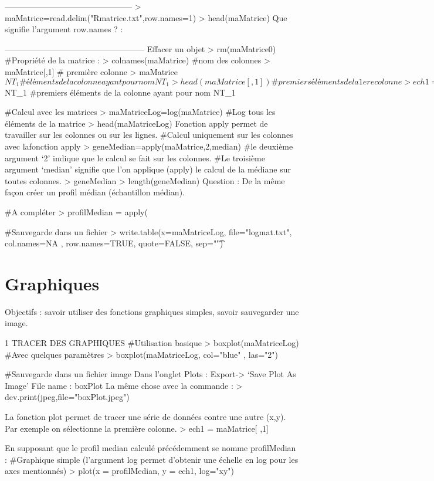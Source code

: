 \documentclass[a4paper]{article}
\begin{document}
-----------------------------------------------
> maMatrice=read.delim("Rmatrice.txt",row.names=1)
> head(maMatrice)
Que signifie l'argument row.names ? :

---------------------------------------------------
Effacer un objet
> rm(maMatrice0)
\#Propriété de la matrice :
> colnames(maMatrice) \#nom des colonnes
> maMatrice[,1] \# première colonne
> maMatrice$NT_1 \# éléments de la colonne ayant pour nom NT_1
> head(maMatrice[,1]) \#premiers éléments de la 1ere colonne
> ech1= maMatrice[,1]
> echNT1=maMatrice$NT_1 \#premiers éléments de la colonne ayant pour nom NT_1

\#Calcul avec les matrices
> maMatriceLog=log(maMatrice) \#Log tous les éléments de la matrice
> head(maMatriceLog)
Fonction apply permet de travailler sur les colonnes ou sur les lignes.
\#Calcul uniquement sur les colonnes avec lafonction apply
> geneMedian=apply(maMatrice,2,median)
\#le deuxième argument ‘2' indique que le calcul se fait sur les colonnes. 
\#Le troisième argument ‘median' signifie que l'on applique (apply) le calcul de la médiane sur toutes colonnes.
> geneMedian
> length(geneMedian)
Question : De la même façon créer un profil médian (échantillon médian).

\#A compléter
> profilMedian = apply(

\#Sauvegarde dans un fichier
> write.table(x=maMatriceLog, file="logmat.txt", col.names=NA ,
row.names=TRUE, quote=FALSE, sep="\t")


\section{Graphiques}
Objectifs : savoir utiliser des fonctions graphiques simples, savoir sauvegarder une image.

1	TRACER DES GRAPHIQUES
\#Utilisation basique
> boxplot(maMatriceLog)
\#Avec quelques paramètres
> boxplot(maMatriceLog, col="blue" , las="2")

\#Sauvegarde dans un fichier image
Dans l'onglet Plots : Export-> ‘Save Plot As Image'
File name :  boxPlot
La même chose avec la commande : 
> dev.print(jpeg,file="boxPlot.jpeg")

La fonction plot permet de tracer une série de données contre une autre (x,y).
Par exemple on sélectionne la première colonne.
> ech1 = maMatrice[ ,1]

En supposant que le profil median calculé précédemment se nomme profilMedian :
\#Graphique simple (l'argument log permet d'obtenir une échelle en log pour les axes mentionnés)
> plot(x = profilMedian, y = ech1, log="xy")
\end{document}
